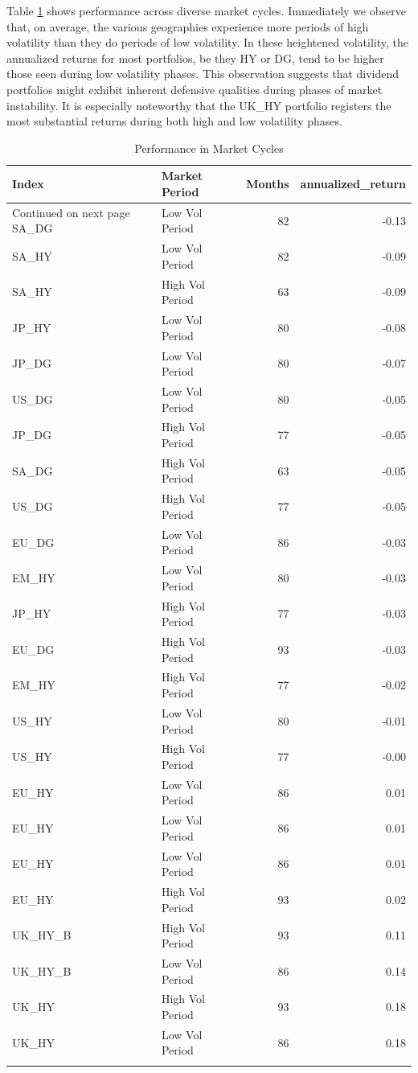 \documentclass[11pt,preprint, authoryear]{elsarticle}
\numberwithin{equation}{section}
\numberwithin{figure}{section}
\numberwithin{table}{section}
\begin{document}
Table \ref{tab2} shows performance across diverse market cycles.
Immediately we observe that, on average, the various geographies
experience more periods of high volatility than they do periods of low
volatility. In these heightened volatility, the annualized returns for
most portfolios, be they HY or DG, tend to be higher those seen during
low volatility phases. This observation suggests that dividend
portfolios might exhibit inherent defensive qualities during phases of
market instability. It is especially noteworthy that the UK\_HY
portfolio registers the most substantial returns during both high and
low volatility phases.

\begingroup\fontsize{12pt}{13pt}\selectfont
\begin{longtable}{llrr}
  \toprule
Index & Market Period & Months & annualized\_return \\ 
  \hline 
\endhead 
\hline 
{\footnotesize Continued on next page} 
\endfoot 
\endlastfoot 
 \midrule
SA\_DG & Low Vol Period &  82 & -0.13 \\ 
  SA\_HY & Low Vol Period &  82 & -0.09 \\ 
  SA\_HY & High Vol Period &  63 & -0.09 \\ 
  JP\_HY & Low Vol Period &  80 & -0.08 \\ 
  JP\_DG & Low Vol Period &  80 & -0.07 \\ 
  US\_DG & Low Vol Period &  80 & -0.05 \\ 
  JP\_DG & High Vol Period &  77 & -0.05 \\ 
  SA\_DG & High Vol Period &  63 & -0.05 \\ 
  US\_DG & High Vol Period &  77 & -0.05 \\ 
  EU\_DG & Low Vol Period &  86 & -0.03 \\ 
  EM\_HY & Low Vol Period &  80 & -0.03 \\ 
  JP\_HY & High Vol Period &  77 & -0.03 \\ 
  EU\_DG & High Vol Period &  93 & -0.03 \\ 
  EM\_HY & High Vol Period &  77 & -0.02 \\ 
  US\_HY & Low Vol Period &  80 & -0.01 \\ 
  US\_HY & High Vol Period &  77 & -0.00 \\ 
  EU\_HY & Low Vol Period &  86 & 0.01 \\ 
  EU\_HY & Low Vol Period &  86 & 0.01 \\ 
  EU\_HY & Low Vol Period &  86 & 0.01 \\ 
  EU\_HY & High Vol Period &  93 & 0.02 \\ 
  UK\_HY\_B & High Vol Period &  93 & 0.11 \\ 
  UK\_HY\_B & Low Vol Period &  86 & 0.14 \\ 
  UK\_HY & High Vol Period &  93 & 0.18 \\ 
  UK\_HY & Low Vol Period &  86 & 0.18 \\ 
   \bottomrule
\caption{Performance in Market Cycles\label{tab2}} 
\end{longtable}
\endgroup
\end{document}
